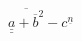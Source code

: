 \documentclass[nofonts]{ctexbook}
\begin{document}
$ \overline{\underline{\underline{a}} + \overline{b}^2} - c^{\underline{n}} $
\end{document}
